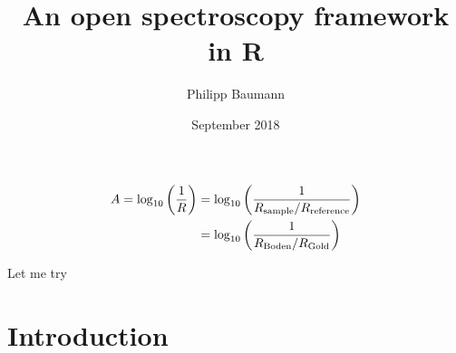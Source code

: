 \documentclass{article}
\title{An open spectroscopy framework in R}
\author{Philipp Baumann}
\date{September 2018}
\begin{document}
\maketitle

\begin{equation}
\begin{split}
    A = \log_{10}\left({\frac{1}{R}}\right) & = \log_{10}\left({\frac{1}{R_\textnormal{sample} / R_\textnormal{reference}}}\right) \\ & =
    \log_{10}\left({\frac{1}{R_\textnormal{Boden} / R_\textnormal{Gold}}}\right)
\end{split}
\end{equation}

Let me try

\section{Introduction}
\end{document}
